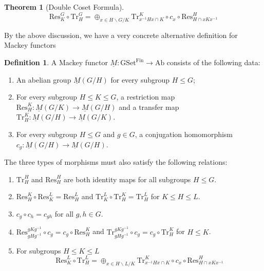 \documentclass{article}
\theoremstyle{definition}
\newtheorem{theorem}{Theorem}[section]
\theoremstyle{definition}
\newtheorem{definition}{Definition}[theorem]
\theoremstyle{definition}
\theoremstyle{definition}
\theoremstyle{definition}
\theoremstyle{definition}
\theoremstyle{definition}
\begin{document}
\begin{tcolorbox}[colback=red!5!white,colframe=red!30!white]
\begin{theorem}[Double Coset Formula]
    \[\textrm{Res}_K^G\circ \textrm{Tr}_H^G=\oplus_{x\in H\backslash G/K }\textrm{Tr}_{x^{-1}Hx\cap K}^{K}\circ c_{x}\circ \textrm{Res}_{H\cap xKx^{-1}}^{H}\]
\end{theorem}
\end{tcolorbox}

By the above discussion, we have a very concrete alternative definition for Mackey functors


\begin{tcolorbox}[colback=purple!5!white,colframe=purple!75!black]
\begin{definition}
A Mackey functor $\underline{M}: \textrm{GSet}^{\textrm{Fin}}\to \textrm{Ab}$ consists of the following data:  
\begin{enumerate}
    \item An abelian group $\underline{M}(G/H)$ for every subgroup $H\leq G$;
    \item For every subgroup $H\leq K\leq G$, a restriction map $\textrm{Res}_H^K: \underline{M}(G/K)\to \underline{M}(G/H)$ and a transfer map $\textrm{Tr}_H^K: \underline{M}(G/H)\to \underline{M}(G/K)$.
    \item For every subgroup $H\leq G$ and $g\in G$, a conjugation homomorphism $c_g: \underline{M}(G/H)\to \underline{M}(G/H)$.
    

\end{enumerate}
The three types of morphisms must also satisfy the following relations:
\begin{enumerate}
    \item $\textrm{Tr}_H^H$ and $\textrm{Res}_H^H$ are both identity maps for all subgroups $H\leq G$.
    \item $\textrm{Res}_H^K\circ \textrm{Res}_K^L=\textrm{Res}_H^L$ and 
     $\textrm{Tr}_K^L\circ \textrm{Tr}_H^K=\textrm{Tr}_H^L$ for $K\leq H\leq L$.
    \item $c_g\circ c_h=c_{gh}$ for all $g,h\in G$.
    \item $\textrm{Res}_{gHg^{-1}}^{gKg^{-1}}\circ c_g=c_g\circ \textrm{Res}^{K}_{H}$ and $\textrm{Tr}_{gHg^{-1}}^{gKg^{-1}}\circ c_g=c_g\circ \textrm{Tr}^{K}_{H}$ for $H\leq K$.
    \item   For subgroups $H\leq K\leq L$
      \[\textrm{Res}_K^L\circ \textrm{Tr}_H^L=\oplus_{x\in H\backslash L/K }\textrm{Tr}_{x^{-1}Hx\cap K}^{K}\circ c_{x}\circ \textrm{Res}_{H\cap xKx^{-1}}^{H}\]
\end{enumerate}
\end{definition}
\end{tcolorbox}
\end{document}
